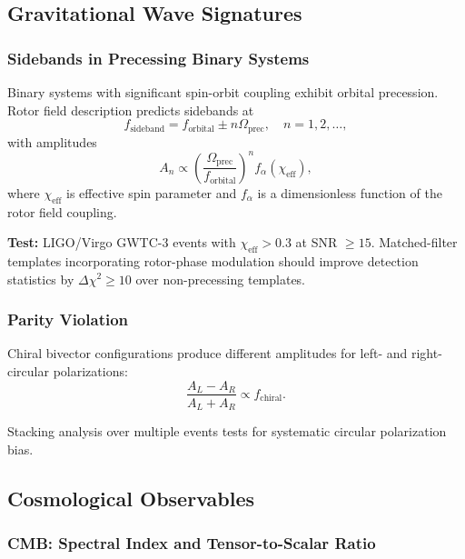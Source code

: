 \documentclass[11pt,a4paper]{article}
\numberwithin{equation}{section}
\theoremstyle{plain}
\theoremstyle{definition}
\theoremstyle{remark}
\begin{document}
\subsection{Gravitational Wave Signatures}

\subsubsection{Sidebands in Precessing Binary Systems}

Binary systems with significant spin-orbit coupling exhibit orbital precession. Rotor field description predicts sidebands at
\begin{equation}
f_{\mathrm{sideband}} = f_{\mathrm{orbital}} \pm n\Omega_{\mathrm{prec}}, \quad n = 1,2,\ldots,
\label{eq:gw-sidebands}
\end{equation}
with amplitudes
\begin{equation}
A_n \propto \left(\frac{\Omega_{\mathrm{prec}}}{f_{\mathrm{orbital}}}\right)^n f_{\alpha}(\chi_{\mathrm{eff}}),
\end{equation}
where $\chi_{\mathrm{eff}}$ is effective spin parameter and $f_{\alpha}$ is a dimensionless function of the rotor field coupling.

\textbf{Test:} LIGO/Virgo GWTC-3 events with $\chi_{\mathrm{eff}} > 0.3$ at SNR $\geq 15$. Matched-filter templates incorporating rotor-phase modulation should improve detection statistics by $\Delta\chi^2 \geq 10$ over non-precessing templates.

\subsubsection{Parity Violation}

Chiral bivector configurations produce different amplitudes for left- and right-circular polarizations:
\begin{equation}
\frac{A_L - A_R}{A_L + A_R} \propto f_{\mathrm{chiral}}.
\end{equation}

Stacking analysis over multiple events tests for systematic circular polarization bias.

\subsection{Cosmological Observables}

\subsubsection{CMB: Spectral Index and Tensor-to-Scalar Ratio}
\end{document}
